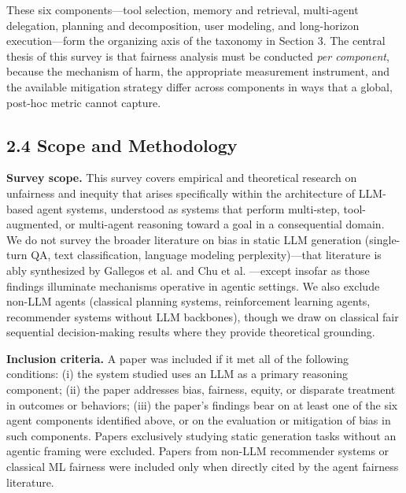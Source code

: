\documentclass[sigconf,nonacm]{acmart}
\begin{document}
These six components—tool selection, memory and retrieval, multi-agent delegation, planning and decomposition, user modeling, and long-horizon execution—form the organizing axis of the taxonomy in Section 3. The central thesis of this survey is that fairness analysis must be conducted \emph{per component}, because the mechanism of harm, the appropriate measurement instrument, and the available mitigation strategy differ across components in ways that a global, post-hoc metric cannot capture.

\subsection{2.4 Scope and Methodology}

\textbf{Survey scope.} This survey covers empirical and theoretical research on unfairness and inequity that arises specifically within the architecture of LLM-based agent systems, understood as systems that perform multi-step, tool-augmented, or multi-agent reasoning toward a goal in a consequential domain. We do not survey the broader literature on bias in static LLM generation (single-turn QA, text classification, language modeling perplexity)—that literature is ably synthesized by Gallegos et al. \cite{gallegos2024bias} and Chu et al. \cite{chu2024fairness}—except insofar as those findings illuminate mechanisms operative in agentic settings. We also exclude non-LLM agents (classical planning systems, reinforcement learning agents, recommender systems without LLM backbones), though we draw on classical fair sequential decision-making results where they provide theoretical grounding.

\textbf{Inclusion criteria.} A paper was included if it met all of the following conditions: (i) the system studied uses an LLM as a primary reasoning component; (ii) the paper addresses bias, fairness, equity, or disparate treatment in outcomes or behaviors; (iii) the paper's findings bear on at least one of the six agent components identified above, or on the evaluation or mitigation of bias in such components. Papers exclusively studying static generation tasks without an agentic framing were excluded. Papers from non-LLM recommender systems or classical ML fairness were included only when directly cited by the agent fairness literature.
\end{document}
